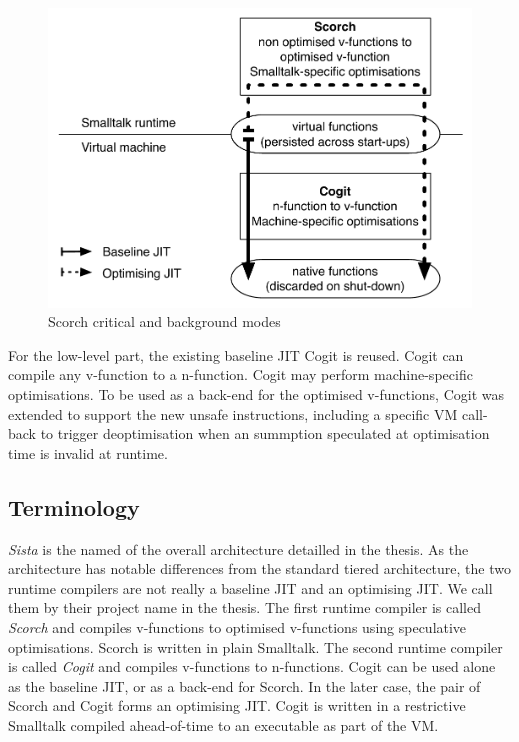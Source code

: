 \documentclass[a4paper,12pt,twoside]{../includes/ThesisStyle}
\begin{document}
\begin{figure}[h!]
    \begin{center}
        \includegraphics[width=0.8\linewidth]{OptArchitecture}
        \caption{Scorch critical and background modes}
        \label{fig:OptArchitecture}
    \end{center}
\end{figure}

For the low-level part, the existing baseline JIT Cogit is reused. Cogit can compile any v-function to a n-function. Cogit may perform machine-specific optimisations. To be used as a back-end for the optimised v-functions, Cogit was extended to support the new unsafe instructions, including a specific VM call-back to trigger deoptimisation when an summption speculated at optimisation time is invalid at runtime.

\subsection{Terminology}
\label{sec:terminologyI}
\emph{Sista} is the named of the overall architecture detailled in the thesis. As the architecture has notable differences from the standard tiered architecture, the two runtime compilers are not really a baseline JIT and an optimising JIT. We call them by their project name in the thesis. The first runtime compiler is called \emph{Scorch} and compiles v-functions to optimised v-functions using speculative optimisations. Scorch is written in plain Smalltalk. The second runtime compiler is called \emph{Cogit} and compiles v-functions to n-functions. Cogit can be used alone as the baseline JIT, or as a back-end for Scorch. In the later case, the pair of Scorch and Cogit forms an optimising JIT. Cogit is written in a restrictive Smalltalk compiled ahead-of-time to an executable as part of the VM. 
\end{document}
